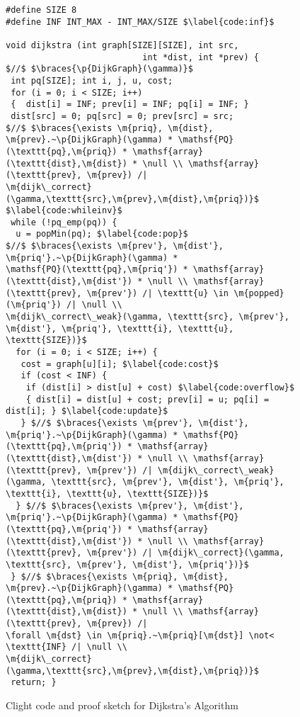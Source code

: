 
\begin{figure}[htbp]

\begin{lstlisting}[mathescape=true,showlines=true]
#define SIZE 8
#define INF INT_MAX - INT_MAX/SIZE $\label{code:inf}$

void dijkstra (int graph[SIZE][SIZE], int src, 
                           int *dist, int *prev) {
$//$ $\braces{\p{DijkGraph}(\gamma)}$
 int pq[SIZE]; int i, j, u, cost;
 for (i = 0; i < SIZE; i++) 
 {  dist[i] = INF; prev[i] = INF; pq[i] = INF; }
 dist[src] = 0; pq[src] = 0; prev[src] = src;
$//$ $\braces{\exists \m{priq}, \m{dist}, \m{prev}.~\p{DijkGraph}(\gamma) * \mathsf{PQ}(\texttt{pq},\m{priq}) * \mathsf{array}(\texttt{dist},\m{dist}) * \null \\ \mathsf{array}(\texttt{prev}, \m{prev}) /|
\m{dijk\_correct}(\gamma,\texttt{src},\m{prev},\m{dist},\m{priq})}$ $\label{code:whileinv}$
 while (!pq_emp(pq)) {
  u = popMin(pq); $\label{code:pop}$
$//$ $\braces{\exists \m{prev'}, \m{dist'}, \m{priq'}.~\p{DijkGraph}(\gamma) *
\mathsf{PQ}(\texttt{pq},\m{priq'}) * \mathsf{array}(\texttt{dist},\m{dist'}) * \null \\ \mathsf{array}(\texttt{prev}, \m{prev'}) /| \texttt{u} \in \m{popped}(\m{priq'}) /| \null \\
\m{dijk\_correct\_weak}(\gamma, \texttt{src}, \m{prev'}, \m{dist'}, \m{priq'}, \texttt{i}, \texttt{u}, \texttt{SIZE})}$
  for (i = 0; i < SIZE; i++) {
   cost = graph[u][i]; $\label{code:cost}$
   if (cost < INF) {
    if (dist[i] > dist[u] + cost) $\label{code:overflow}$
    { dist[i] = dist[u] + cost; prev[i] = u; pq[i] = dist[i]; } $\label{code:update}$
   } $//$ $\braces{\exists \m{prev'}, \m{dist'}, \m{priq'}.~\p{DijkGraph}(\gamma) * \mathsf{PQ}(\texttt{pq},\m{priq'}) * \mathsf{array}(\texttt{dist},\m{dist'}) * \null \\ \mathsf{array}(\texttt{prev}, \m{prev'}) /| \m{dijk\_correct\_weak}(\gamma, \texttt{src}, \m{prev'}, \m{dist'}, \m{priq'}, \texttt{i}, \texttt{u}, \texttt{SIZE})}$  
  } $//$ $\braces{\exists \m{prev'}, \m{dist'}, \m{priq'}.~\p{DijkGraph}(\gamma) * \mathsf{PQ}(\texttt{pq},\m{priq'}) * \mathsf{array}(\texttt{dist},\m{dist'}) * \null \\ \mathsf{array}(\texttt{prev}, \m{prev'}) /| \m{dijk\_correct}(\gamma, \texttt{src}, \m{prev'}, \m{dist'}, \m{priq'})}$
 } $//$ $\braces{\exists \m{priq}, \m{dist}, \m{prev}.~\p{DijkGraph}(\gamma) * \mathsf{PQ}(\texttt{pq},\m{priq}) * \mathsf{array}(\texttt{dist},\m{dist}) * \null \\ \mathsf{array}(\texttt{prev}, \m{prev}) /| 
\forall \m{dst} \in \m{priq}.~\m{priq}[\m{dst}] \not< \texttt{INF} /| \null \\
\m{dijk\_correct}(\gamma,\texttt{src},\m{prev},\m{dist},\m{priq})}$
 return; }
\end{lstlisting}
\caption{Clight code and proof sketch for Dijkstra's Algorithm}
\label{fig:decorated}
\end{figure}